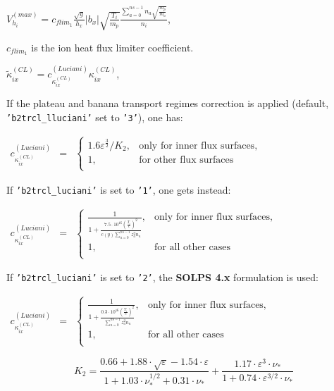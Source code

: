 \documentclass[a4paper,10pt]{report}
\newcommand\SOLPSfour{{\bf SOLPS 4.x} }
\begin{document}
$V_{h_i}^{(max)} = c_{flim_1} \frac{\sqrt g}{h_x} |b_x| \sqrt{\frac{T_i}{m_p}}
\frac{\sum \limits_{a=0}^{ns-1}  n_a \sqrt{\frac{m_p}{m_a}}}{n_i}$,

$c_{flim_1}$ is the ion heat flux limiter coefficient.

$\tilde{\kappa}_{ix}^{(CL)} = c_{\kappa_{ix}^{(CL)}}^{(Luciani)} \kappa_{ix}^{(CL)}$,

If the plateau and banana transport regimes correction is applied (default, {\tt 'b2trcl\_lluciani'} set to {\tt '3'}), one has:

$
\begin{matrix}
c_{\kappa_{ix}^{(CL)}}^{(Luciani)} & =
& \left\{
\begin{matrix}
1.6 \varepsilon^{\frac{3}{2}}/K_2, & \text{only for inner flux surfaces,} \\
1, &  \text{for other flux surfaces} \\
\end{matrix} \right.
\end{matrix}
$

If {\tt 'b2trcl\_luciani'} is set to {\tt '1'}, one gets instead:

$
\begin{matrix}
c_{\kappa_{ix}^{(CL)}}^{(Luciani)} & =
& \left\{
\begin{matrix}
\frac 1 {
1 + \frac{
7.5 \cdot 10^{16} \left( \frac{T_i} e \right)^2}
{c(y) \sum \limits_{a=0}^{ns-1} z_a^2 n_a}
}
, &  \text{only for inner flux surfaces,} \\
1, &  \text{for all other cases} \\
\end{matrix} \right.
\end{matrix}
$

If {\tt 'b2trcl\_luciani'} is set to {\tt '2'}, the \SOLPSfour formulation is used:

$
\begin{matrix}
c_{\kappa_{ix}^{(CL)}}^{(Luciani)} & =
& \left\{
\begin{matrix}
\frac 1 {
1 + \frac{
0.3 \cdot 10^{16} \left( \frac{T_i} e \right)^2}
{\sum \limits_{a=0}^{ns-1} z_a^2 n_a}
}
, &  \text{only for inner flux surfaces,} \\
1, &  \text{for all other cases} \\
\end{matrix} \right.
\end{matrix}
$


\begin{equation*}
K_2 = \frac{
	0.66 + 1.88 \cdot \sqrt{\varepsilon} - 1.54 \cdot \varepsilon
}
{
	1 + 1.03 \cdot \nu_{\ast}^{1/2} + 0.31 \cdot \nu_{\ast}
}
+
\frac{
	1.17 \cdot \varepsilon ^3 \cdot \nu_{\ast}
}
{
	1 + 0.74 \cdot \varepsilon^{3/2} \cdot \nu_{\ast}
}
\end{equation*}
\end{document}
